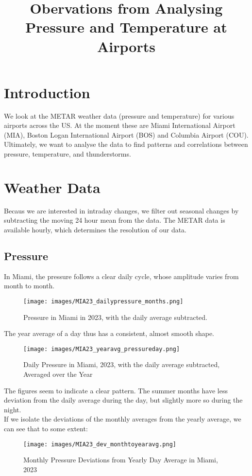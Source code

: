 \documentclass[12pt, parskip=half]{scrartcl}
\begin{document}
\title{Obervations from Analysing Pressure and Temperature at Airports}

\section{Introduction}
We look at the METAR weather data (pressure and temperature) for various airports across the US.
At the moment these are Miami International Airport (MIA), Boston Logan International Airport (BOS) and Columbia Airport (COU).
Ultimately, we want to analyse the data to find patterns and correlations between pressure, temperature, and thunderstorms.


\section{Weather Data}
Becaus we are interested in intraday changes, we filter out seasonal changes by subtracting the moving 24 hour mean from the data.
The METAR data is available hourly, which determines the resolution of our data.

\subsection{Pressure}
In Miami, the pressure follows a clear daily cycle, whose amplitude varies from month to month.
\begin{figure}[!h]
\centering
\texttt{[image: images/MIA23\_dailypressure\_months.png]}
\caption{Pressure in Miami in 2023, with the daily average subtracted.}
\end{figure}

The year average of a day thus has a consistent, almost smooth shape.

\begin{figure}[!h]
\centering
\texttt{[image: images/MIA23\_yearavg\_pressureday.png]}
\caption{Daily Pressure in Miami, 2023, with the daily average subtracted, Averaged over the Year}
\end{figure}

The figures seem to indicate a clear pattern.
The summer months have less deviation from the daily average during the day, but slightly more so during the night.\\


If we isolate the deviations of the monthly averages from the yearly average, we can see that to some extent: 

\begin{figure}[!h]
\centering
\texttt{[image: images/MIA23\_dev\_monthtoyearavg.png]}
\caption{Monthly Pressure Deviations from Yearly Day Average in Miami, 2023}
\end{figure}
\end{document}
